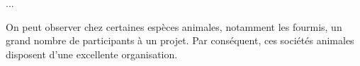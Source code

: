 
...

On peut observer chez certaines espèces animales, notamment les fourmis, un grand nombre de participants à un projet. Par conséquent, ces sociétés animales disposent d'une excellente organisation.

